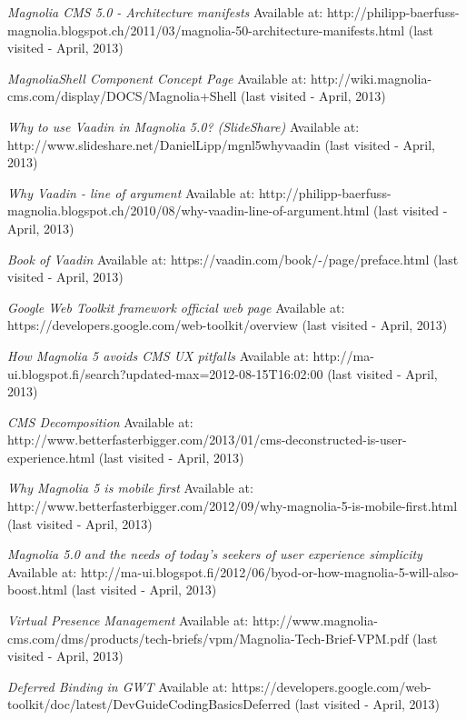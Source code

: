 \begin{thebibliography}{9}
\emph{Magnolia CMS 5.0 - Architecture manifests} 
Available at: http://philipp-baerfuss-magnolia.blogspot.ch/2011/03/magnolia-50-architecture-manifests.html (last visited - April, 2013) 
  
\emph{MagnoliaShell Component Concept Page} 
Available at: http://wiki.magnolia-cms.com/display/DOCS/Magnolia+Shell (last visited - April, 2013)
 
\emph{Why to use Vaadin in Magnolia 5.0? (SlideShare)} 
Available at: http://www.slideshare.net/DanielLipp/mgnl5whyvaadin (last visited - April, 2013)

\emph{Why Vaadin - line of argument} 
Available at: http://philipp-baerfuss-magnolia.blogspot.ch/2010/08/why-vaadin-line-of-argument.html (last visited - April, 2013)
  
\emph{Book of Vaadin}
Available at: https://vaadin.com/book/-/page/preface.html (last visited - April, 2013)
  
\emph{Google Web Toolkit framework official web page} 
Available at: https://developers.google.com/web-toolkit/overview (last visited - April, 2013)
  
\emph{How Magnolia 5 avoids CMS UX pitfalls}  
Available at: http://ma-ui.blogspot.fi/search?updated-max=2012-08-15T16:02:00%
(last visited - April, 2013)

\emph{CMS Decomposition}  
Available at: http://www.betterfasterbigger.com/2013/01/cms-deconstructed-is-user-experience.html (last visited - April, 2013)
 
\emph{Why Magnolia 5 is mobile first}  
Available at: http://www.betterfasterbigger.com/2012/09/why-magnolia-5-is-mobile-first.html (last visited - April, 2013)
 
\emph{Magnolia 5.0 and the needs of today's seekers of user experience simplicity}
Available at: http://ma-ui.blogspot.fi/2012/06/byod-or-how-magnolia-5-will-also-boost.html (last visited - April, 2013)
 
\emph{Virtual Presence Management} 
 Available at: http://www.magnolia-cms.com/dms/products/tech-briefs/vpm/Magnolia-Tech-Brief-VPM.pdf (last visited - April, 2013)
 
\emph{Deferred Binding in GWT} 
Available at: https://developers.google.com/web-toolkit/doc/latest/DevGuideCodingBasicsDeferred (last visited - April, 2013)


\end{thebibliography}
